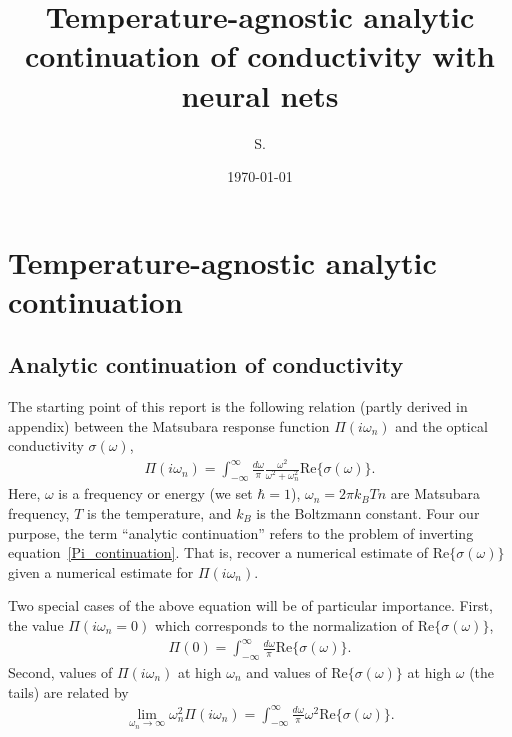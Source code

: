 \documentclass[notitlepage,11pt,nofootinbib]{revtex4-1}
\begin{document}
\title{\bf Temperature-agnostic analytic continuation of conductivity with neural nets}
\author{S. }
\date{\today}

\begin{abstract}

\end{abstract}

\maketitle
\vspace{-.5cm}
\tableofcontents

\section{Temperature-agnostic analytic continuation}

\subsection{Analytic continuation of conductivity}

The starting point of this report is the following relation (partly derived in appendix) between the Matsubara response function $\Pi(i\omega_n)$ and the optical conductivity $\sigma(\omega)$,
\begin{align}
\Pi(i\omega_n) 
=
\int_{-\infty}^{\infty} \frac{d\omega}{\pi} \frac{\omega^2}{\omega^2+\omega_n^2}
\text{Re}\{ \sigma(\omega) \}.
\label{Pi_continuation}
\end{align}
Here, $\omega$ is a frequency or energy (we set $\hbar=1$), $\omega_n=2\pi k_BTn$ are Matsubara frequency, $T$ is the temperature, and $k_B$ is the Boltzmann constant.
Four our purpose, the term ``analytic continuation'' refers to the problem of inverting equation~\eqref{Pi_continuation}. That is, recover a numerical estimate of $\text{Re}\{ \sigma(\omega) \}$ given a numerical estimate for $\Pi(i\omega_n)$.


Two special cases of the above equation will be of particular importance. First, the value $\Pi(i\omega_n=0)$ which corresponds to the normalization of $\text{Re}\{ \sigma(\omega) \}$,
\begin{align}
\Pi(0) 
=
\int_{-\infty}^{\infty} \frac{d\omega}{\pi}
\text{Re}\{ \sigma(\omega) \}.
\label{Pi_normalization}
\end{align}
Second, values of $\Pi(i\omega_n)$ at high $\omega_n$ and values of $\text{Re}\{ \sigma(\omega) \}$ at high $\omega$ (the tails) are related by
\begin{align}
\lim_{\omega_n\rightarrow\infty}
\omega_n^2
\Pi(i\omega_n)
=
\int_{-\infty}^{\infty} \frac{d\omega}{\pi}\omega^2 
\text{Re}\{ \sigma(\omega) \}.
\label{Pi_moment}
\end{align}
\end{document}
